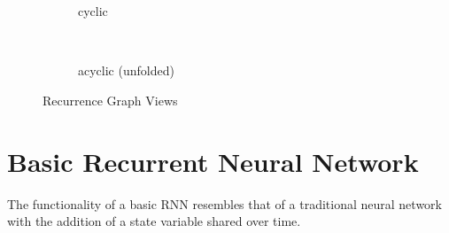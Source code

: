 \newsavebox{\recurrent}
\newsavebox{\recurrentuf}
\begin{figure}[H]
  \centering
  \begin{subfigure}[]{\wd\recurrent}
    \begin{center}
      \usebox{\recurrent}
    \end{center}
    \caption{cyclic}
    \label{fig:recurrent}
  \end{subfigure}
  ~
  \begin{subfigure}[]{\wd\recurrentuf}
    \begin{center}
      \usebox{\recurrentuf}
    \end{center}
    \caption{acyclic (unfolded)}
    \label{fig:recurrent_uf}
  \end{subfigure}
  \caption{Recurrence Graph Views}
  \label{fig:recurrence}
\end{figure}


\section{Basic Recurrent Neural Network}

The functionality of a basic RNN resembles that of a traditional neural network with the addition of a state variable shared over time.


